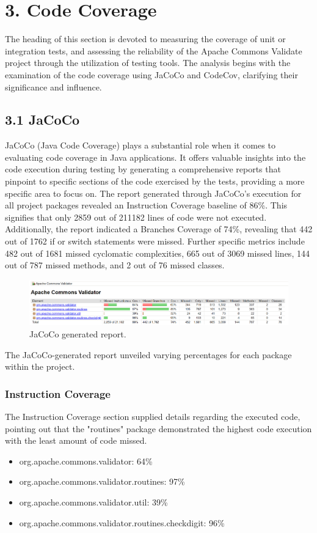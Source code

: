 \documentclass{sigchi}
\begin{document}
\section{3. Code Coverage}

The heading of this section is devoted to measuring the coverage of unit or integration tests, and assessing the reliability of the Apache Commons Validate project through the utilization of testing tools. The analysis begins with the examination of the code coverage using JaCoCo and CodeCov, clarifying their significance and influence. 

\subsection{3.1 JaCoCo}

JaCoCo (Java Code Coverage) \cite{jacoco} plays a substantial role when it comes to evaluating code coverage in Java applications. It offers valuable insights into the code execution during testing by generating a comprehensive reports that pinpoint to specific sections of the code exercised by the tests, providing a more specific area to focus on.
The report generated through JaCoCo's execution for all project packages revealed an Instruction Coverage baseline of 86\%. This signifies that only 2859 out of 211182 lines of code were not executed. 
Additionally, the report indicated a Branches Coverage of 74\%, revealing that 442 out of 1762 if or switch statements were missed. Further specific metrics include 482 out of 1681 missed cyclomatic complexities, 665 out of 3069 missed lines, 144 out of 787 missed methods, and 2 out of 76 missed classes.
\begin{figure}[h!]
    \centering
    \includegraphics[width=1\columnwidth]{jacocoReport.png}
    \caption{JaCoCo generated report.}
    \label{fig:enter-label}
\end{figure}
The JaCoCo-generated report unveiled varying percentages for each package within the project.
\subsubsection{\textbf{Instruction Coverage}}
The Instruction Coverage section supplied details regarding the executed code, pointing out that the "routines" package demonstrated the highest code execution with the least amount of code missed.
\begin{itemize}
    \item org.apache.commons.validator: 64\%
    \item org.apache.commons.validator.routines: 97\%
    \item org.apache.commons.validator.util: 39\%
    \item org.apache.commons.validator.routines.checkdigit: 96\%
\end{itemize}
\end{document}
